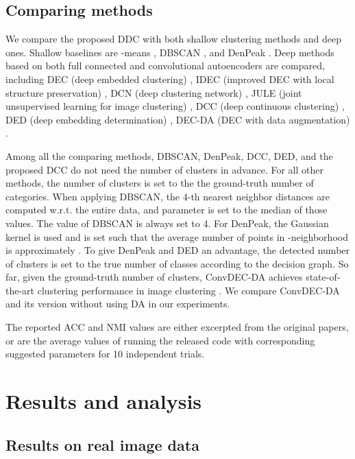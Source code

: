 \documentclass[10pt,twocolumn,letterpaper]{article}
\begin{document}
\subsection{Comparing methods}\label{sec:methods}
We compare the proposed DDC with both shallow clustering methods and deep ones.
Shallow baselines are -means \cite{MACQUEEN1967SomeMF}, DBSCAN \cite{ester1996density}, and DenPeak \cite{rodriguez2014clustering}. 
Deep methods based on both full connected and convolutional autoencoders are compared, including DEC (deep embedded clustering) \cite{Xie2016UnsupervisedDE}, IDEC (improved DEC with local structure preservation) \cite{guo2017improved}, DCN (deep clustering network) \cite{Yang2017towards}, JULE (joint unsupervised learning for image clustering) \cite{yang2016joint}, DCC (deep continuous clustering) \cite{Shah2018DCC}, DED (deep embedding determination) \cite{Wang2018DED}, DEC-DA (DEC with data augmentation) \cite{Guo2018DEC-DA}.

Among all the comparing methods, DBSCAN, DenPeak, DCC, DED, and the proposed DCC do not need the number of clusters in advance. For all other methods, the number of clusters is set to the the ground-truth number of categories. 
When applying DBSCAN, the 4-th nearest neighbor distances are computed w.r.t. the entire data, and parameter  is set to the median of those values. The  value of DBSCAN is always set to 4. For DenPeak, the Gaussian kernel is used and  is set such that the average number of points in -neighborhood is approximately . To give DenPeak and DED an advantage, the detected number of clusters is set to the true number of classes according to the decision graph.
So far, given the ground-truth number of clusters, ConvDEC-DA achieves state-of-the-art clustering performance in image clustering \cite{Guo2018DEC-DA}. We compare ConvDEC-DA and its version without using DA in our experiments.

The reported ACC and NMI values are either excerpted from the original papers, or are the average values of running the released code with corresponding suggested parameters for 10 independent trials.

\section{Results and analysis}\label{sec:results}

\subsection{Results on real image data}
\end{document}
